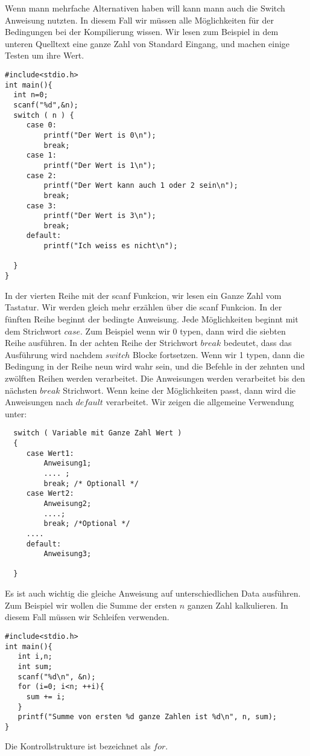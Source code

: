 \documentclass{article}[12pt]
\begin{document}
Wenn mann mehrfache Alternativen haben will kann mann auch die Switch Anweisung nutzten. In diesem Fall wir müssen 
alle Möglichkeiten für der Bedingungen bei der Kompilierung wissen. Wir lesen zum Beispiel in dem unteren Quelltext eine
ganze Zahl von Standard Eingang, und machen einige Testen um ihre Wert.
\begin{lstlisting}
#include<stdio.h>
int main(){
  int n=0;
  scanf("%d",&n);
  switch ( n ) {
     case 0: 
         printf("Der Wert is 0\n");
         break;
     case 1:
         printf("Der Wert is 1\n");
     case 2:
         printf("Der Wert kann auch 1 oder 2 sein\n");
         break;
     case 3:
         printf("Der Wert is 3\n");
         break;
     default:
         printf("Ich weiss es nicht\n");
     
  }
}
\end{lstlisting}
In der vierten Reihe mit der scanf Funkcion, wir lesen ein Ganze Zahl vom Tastatur. Wir werden gleich mehr erzählen über die
scanf Funkcion. In der fünften Reihe beginnt der bedingte Anweisung. Jede Möglichkeiten beginnt mit dem Strichwort $case$.
Zum Beispiel wenn wir 0 typen, dann wird die siebten Reihe ausführen. In der achten Reihe der Strichwort $break$ bedeutet, dass
das Ausführung wird nachdem $switch$ Blocke fortsetzen. Wenn wir 1 typen, dann die Bedingung in der Reihe neun wird wahr sein, und
die Befehle in der zehnten und zwölften Reihen werden verarbeitet. Die Anweisungen werden verarbeitet bis den nächsten $break$ 
Strichwort. Wenn keine der Möglichkeiten passt, dann wird die Anweisungen nach $default$ verarbeitet.  Wir zeigen die allgemeine
Verwendung unter:

\begin{lstlisting}
  switch ( Variable mit Ganze Zahl Wert )
  {
     case Wert1:
         Anweisung1;
         .... ;
         break; /* Optionall */
     case Wert2:
         Anweisung2;
         ....; 
         break; /*Optional */
     ....
     default:
         Anweisung3;

  }
\end{lstlisting}

Es ist auch wichtig die gleiche Anweisung auf unterschiedlichen Data ausführen. Zum Beispiel wir wollen die Summe der ersten
$n$ ganzen Zahl kalkulieren. In diesem Fall müssen wir Schleifen verwenden. 
\begin{lstlisting}
#include<stdio.h>
int main(){
   int i,n;
   int sum;
   scanf("%d\n", &n);
   for (i=0; i<n; ++i){
     sum += i; 
   }
   printf("Summe von ersten %d ganze Zahlen ist %d\n", n, sum);
}
\end{lstlisting}
Die Kontrollstrukture ist bezeichnet als $for$. 
\pagebreak
\end{document}
